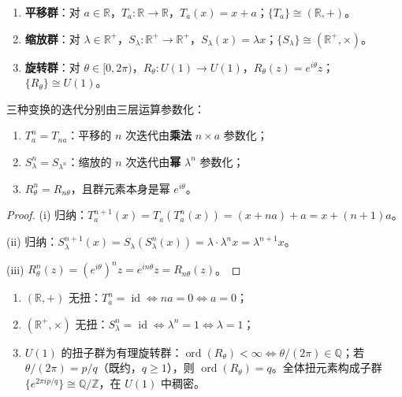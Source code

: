 \begin{definition}[三种基本变换群]\label{def:three_transformations}
\begin{enumerate}[label=(\roman*)]
    \item \textbf{平移群}：对 $a\in\mathbb{R}$，$T_a:\mathbb{R}\to\mathbb{R}$，$T_a(x)=x+a$；$\{T_a\}\cong(\mathbb{R},+)$。
    \item \textbf{缩放群}：对 $\lambda\in\mathbb{R}^+$，$S_\lambda:\mathbb{R}^+\to\mathbb{R}^+$，$S_\lambda(x)=\lambda x$；$\{S_\lambda\}\cong(\mathbb{R}^+,\times)$。
    \item \textbf{旋转群}：对 $\theta\in[0,2\pi)$，$R_\theta:U(1)\to U(1)$，$R_\theta(z)=e^{i\theta}z$；$\{R_\theta\}\cong U(1)$。
\end{enumerate}
\end{definition}

\begin{theorem}[变换的迭代生成]\label{thm:transformation_iteration}
三种变换的迭代分别由三层运算参数化：
\begin{enumerate}[label=(\roman*)]
    \item $T_a^n=T_{na}$：平移的 $n$ 次迭代由\textbf{乘法} $n\times a$ 参数化；
    \item $S_\lambda^n=S_{\lambda^n}$：缩放的 $n$ 次迭代由\textbf{幂} $\lambda^n$ 参数化；
    \item $R_\theta^n=R_{n\theta}$，且群元素本身是幂 $e^{i\theta}$。
\end{enumerate}
\end{theorem}

\begin{proof}
(i) 归纳：$T_a^{n+1}(x)=T_a(T_a^n(x))=(x+na)+a=x+(n+1)a$。

(ii) 归纳：$S_\lambda^{n+1}(x)=S_\lambda(S_\lambda^n(x))=\lambda\cdot\lambda^n x=\lambda^{n+1}x$。

(iii) $R_\theta^n(z)=(e^{i\theta})^n z=e^{in\theta}z=R_{n\theta}(z)$。
\end{proof}

\begin{theorem}[三种变换的阶结构]\label{thm:order_structure}
\begin{enumerate}[label=(\roman*)]
    \item $(\mathbb{R},+)$ 无扭：$T_a^n=\operatorname{id}\iff na=0\iff a=0$；
    \item $(\mathbb{R}^+,\times)$ 无扭：$S_\lambda^n=\operatorname{id}\iff \lambda^n=1\iff \lambda=1$；
    \item $U(1)$ 的扭子群为有理旋转群：$\operatorname{ord}(R_\theta)<\infty\iff \theta/(2\pi)\in\mathbb{Q}$；若 $\theta/(2\pi)=p/q$（既约，$q\ge 1$），则 $\operatorname{ord}(R_\theta)=q$。全体扭元素构成子群 $\{e^{2\pi i p/q}\}\cong\mathbb{Q}/\mathbb{Z}$，在 $U(1)$ 中稠密。
\end{enumerate}
\end{theorem}

